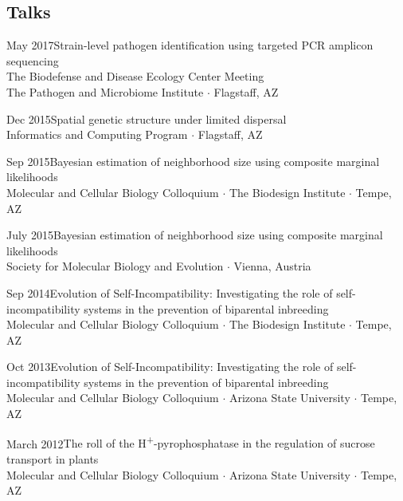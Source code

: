 \documentclass[]{cv-style}          %
\begin{document}
\subsection{Talks}
\begin{entrylist}
{May 2017}{Strain-level pathogen identification using targeted PCR amplicon sequencing}{\\The Biodefense and Disease Ecology Center Meeting\\The Pathogen and Microbiome Institute $\cdotp$ Flagstaff, AZ}
{\vspace{-0.3cm}}

{Dec 2015}{Spatial genetic structure under limited dispersal}{\\Informatics and Computing Program  $\cdotp$ Flagstaff, AZ}
{\vspace{-0.3cm}}

{Sep 2015}{Bayesian estimation of neighborhood size using composite marginal likelihoods}{\\Molecular and Cellular Biology Colloquium $\cdot$ The Biodesign Institute $\cdot$ Tempe, AZ}
{\vspace{-0.3cm}}

{July 2015}{Bayesian estimation of neighborhood size using composite marginal likelihoods}{\\Society for Molecular Biology and Evolution $\cdotp$ Vienna, Austria}
{\vspace{-0.3cm}}

{Sep 2014}{Evolution of Self-Incompatibility: Investigating the role of self-incompatibility systems in the prevention of biparental inbreeding}{\\Molecular and Cellular Biology Colloquium $\cdot$ The Biodesign Institute $\cdot$ Tempe, AZ}
{\vspace{-0.3cm}}

{Oct 2013}{Evolution of Self-Incompatibility: Investigating the role of self-incompatibility systems in the prevention of biparental inbreeding}{\\Molecular and Cellular Biology Colloquium $\cdot$ Arizona State University $\cdot$ Tempe, AZ}
{\vspace{-0.3cm}}

{March 2012}{The roll of the H\textsuperscript{+}-pyrophosphatase in the regulation of sucrose transport in plants}{\\Molecular and Cellular Biology Colloquium $\cdot$ Arizona State University $\cdot$ Tempe, AZ}
{\vspace{-0.3cm}}
\end{entrylist}
\end{document}
